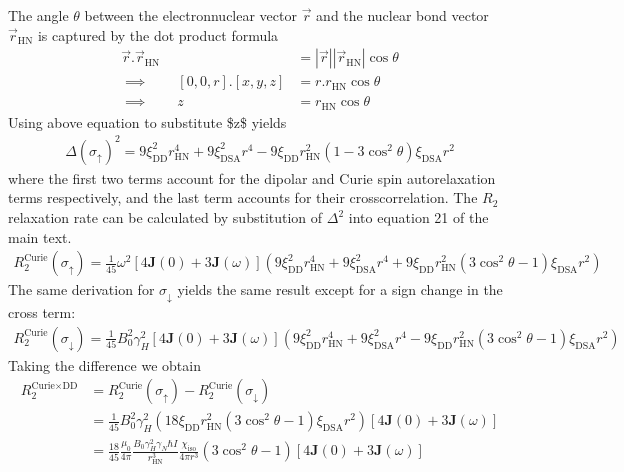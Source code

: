 \documentclass[a4paper,10pt,english,openany,oneside]{sphinxmanual}
\begin{document}
\sphinxAtStartPar
The angle \(\theta\) between the electron\sphinxhyphen{}nuclear vector \(\vec r\) and the nuclear bond vector \(\vec r_\text{HN}\) is captured by the dot product formula
\begin{equation*}
\begin{split}\vec r.\vec r_\text{HN} &= |\vec r||\vec r_\text{HN}| \cos{\theta}\\
\implies \qquad [0,0,r].[x,y,z] &= r.r_\text{HN} \cos{\theta}\\
\implies \qquad  z &= r_\text{HN} \cos{\theta}\end{split}
\end{equation*}
\sphinxAtStartPar
Using above equation to substitute \$z\$ yields
\begin{equation*}
\begin{split}\Delta(\sigma_\uparrow)^2= 9\xi_\text{DD}^2r_\text{HN}^4 + 9\xi_\text{DSA}^2r^4 - 9\xi_\text{DD}r_\text{HN}^2(1-3\cos^2{\theta})\xi_\text{DSA}r^2\end{split}
\end{equation*}
\sphinxAtStartPar
where the first two terms account for the dipolar and Curie spin auto\sphinxhyphen{}relaxation terms respectively, and the last term accounts for their cross\sphinxhyphen{}correlation. The \(R_2\) relaxation rate can be calculated by substitution of \(\Delta^2\) into equation 21 of the main text.
\begin{equation*}
\begin{split}R_2^\text{Curie}(\sigma_\uparrow) = \frac{1}{45}\omega^2 \left[4\mathbf{J}(0) + 3\mathbf{J}(\omega)\right]
\left( 9\xi_\text{DD}^2r_\text{HN}^4 + 9\xi_\text{DSA}^2r^4 +
9\xi_\text{DD}r_\text{HN}^2(3\cos^2{\theta}-1)\xi_\text{DSA}r^2 \right)\end{split}
\end{equation*}
\sphinxAtStartPar
The same derivation for \(\sigma_\downarrow\) yields the same result except for a sign change in the cross term:
\begin{equation*}
\begin{split}R_2^\text{Curie}(\sigma_\downarrow) = \frac{1}{45}B_0^2\gamma_H^2 \left[4\mathbf{J}(0) + 3\mathbf{J}(\omega)\right]
\left( 9\xi_\text{DD}^2r_\text{HN}^4 + 9\xi_\text{DSA}^2r^4 -
9\xi_\text{DD}r_\text{HN}^2(3\cos^2{\theta}-1)\xi_\text{DSA}r^2 \right)\end{split}
\end{equation*}
\sphinxAtStartPar
Taking the difference we obtain
\begin{equation*}
\begin{split}R_2^\text{Curie$\times$DD} &= R_2^\text{Curie}(\sigma_\uparrow) - R_2^\text{Curie}(\sigma_\downarrow)\\
&= \frac{1}{45}B_0^2\gamma_H^2 \left(18\xi_\text{DD}r_\text{HN}^2(3\cos^2{\theta}-1)\xi_\text{DSA}r^2 \right)\left[4\mathbf{J}(0) + 3\mathbf{J}(\omega)\right]\\
&=\frac{18}{45} \frac{\mu_0}{4\pi} \frac{B_0\gamma_H^2\gamma_N\hbar I}{r_\text{HN}^3}\frac{\chi_\text{iso}}{4\pi r^3}(3\cos^2{\theta}-1)\left[4\mathbf{J}(0) + 3\mathbf{J}(\omega)\right]\end{split}
\end{equation*}
\end{document}

